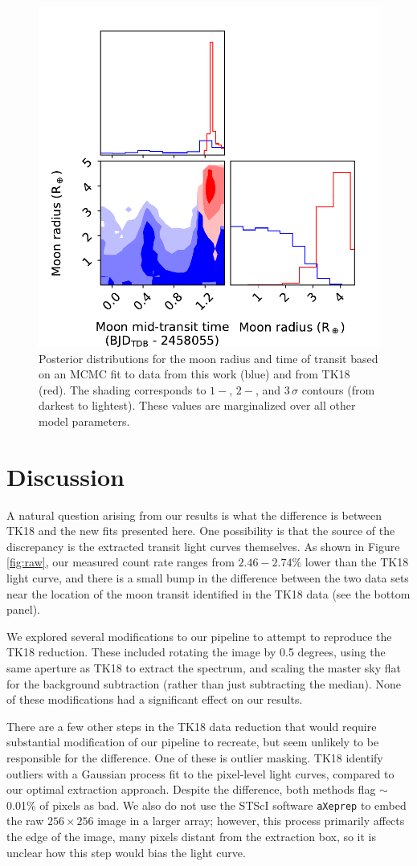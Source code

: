 \documentclass[twocolumn]{aastex62}
\begin{document}
\begin{figure}
\includegraphics[width = 0.5 \textwidth]{figures/fig5_pairs.pdf}
    \caption{Posterior distributions for the moon radius and time of transit based on an MCMC fit to data from this work (blue) and from TK18 (red). The shading corresponds to $1-$, $2-$, and $3\,\sigma$ contours (from darkest to lightest). These values are marginalized over all other model parameters.} 
\label{fig:corner}
\end{figure}

\section{Discussion}
A natural question arising from our results is what the difference is between TK18 and the new fits presented here. One possibility is that the source of the discrepancy is the extracted transit light curves themselves. As shown in Figure\,\ref{fig:raw}, our measured count rate ranges from $2.46 -2.74\%$ lower than the TK18 light curve, and there is a small bump in the difference between the two data sets near the location of the moon transit identified in the TK18 data (see the bottom panel).

 We explored several modifications to our pipeline to attempt to reproduce the TK18 reduction. These included rotating the image by 0.5 degrees, using the same aperture as TK18 to extract the spectrum, and scaling the master sky flat for the background subtraction (rather than just subtracting the median). None of these modifications had a significant effect on our results. 

There are a few other steps in the TK18 data reduction that would require substantial modification of our pipeline to recreate, but seem unlikely to be responsible for the difference. One of these is outlier masking. TK18 identify outliers with a Gaussian process fit to the pixel-level light curves, compared to our optimal extraction approach. Despite the difference, both methods flag $\sim$0.01\% of pixels as bad.  We also do not use the STScI software \texttt{aXeprep} to embed the raw $256\times256$ image in a larger array; however, this process primarily affects the edge of the image, many pixels distant from the extraction box, so it is unclear how this step would bias the light curve.
 
\end{document}
